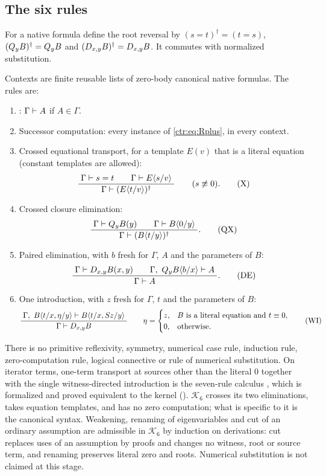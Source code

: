 \subsection{The six rules}

For a native formula define the root reversal by
$(s=t)^\dagger=(t=s)$, $(Q_{y}B)^\dagger=Q_{y}B$ and $(D_{x,y}B)^\dagger=D_{x,y}B$. It
commutes with normalized substitution.

\begin{definition}\label{ctr:def:six}
Contexts are finite reusable lists of zero-body canonical native formulas. The rules are:
\begin{enumerate}
\item {}: $\Gamma\vdash A$ if $A\in\Gamma$.
\item Successor computation: every instance of \eqref{ctr:eq:Rplus}, in every context.
\item Crossed equational transport, for a template $E(v)$ that is a literal equation
(constant templates are allowed):
\[
 \dfrac{\;\Gamma\vdash s=t\qquad \Gamma\vdash E\langle s/v\rangle\;}{\;\Gamma\vdash (E\langle t/v\rangle)^\dagger\;}
 \qquad (s\not\equiv 0). \tag{X}
\]
\item Crossed closure elimination:
\[
 \dfrac{\;\Gamma\vdash Q_{y}B(y)\qquad \Gamma\vdash B\langle 0/y\rangle\;}{\;\Gamma\vdash (B\langle t/y\rangle)^\dagger\;}. \tag{QX}
\]
\item Paired elimination, with $b$ fresh for $\Gamma$, $A$ and the parameters of $B$:
\[
 \dfrac{\;\Gamma\vdash D_{x,y}B(x,y)\qquad \Gamma,\ Q_{y}B\langle b/x\rangle\vdash A\;}{\;\Gamma\vdash A\;}. \tag{DE}
\]
\item One introduction, with $z$ fresh for $\Gamma$, $t$ and the parameters of $B$:
\[
 \dfrac{\;\Gamma,\ B\langle t/x,\eta/y\rangle\vdash B\langle t/x,S z/y\rangle\;}{\;\Gamma\vdash D_{x,y}B\;}
 \qquad
 \eta=\begin{cases} z, & B \text{ is a literal equation and } t\equiv 0,\\
                    0, & \text{otherwise.}\end{cases} \tag{WI}
\]
\end{enumerate}
\end{definition}

There is no primitive reflexivity, symmetry, numerical case rule, induction rule,
zero-computation rule, logical connective or rule of numerical substitution. On iterator
terms, one-term transport at sources other than the literal $0$ together with the single
witness-directed introduction is the seven-rule calculus , which is formalized
and proved equivalent to the kernel (). $\mathcal K_6$ crosses its two
eliminations, takes equation templates, and has no zero computation; what is specific to it
is the canonical syntax. Weakening, renaming of eigenvariables and cut of
an ordinary assumption are admissible in $\mathcal K_6$ by induction on derivations: cut
replaces uses of an assumption by proofs and changes no witness, root or source term, and
renaming preserves literal zero and roots. Numerical substitution is not claimed at this
stage.

